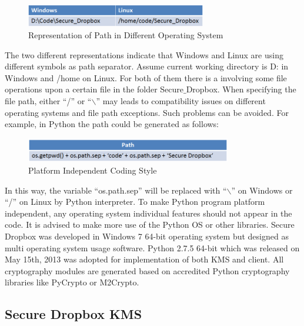 \begin{figure}[h]
        \centering
        \includegraphics[width=0.7\textwidth]{figures/Representation_of_Path_in_Different_Operation_System.png}
        \caption[Path Representation Schema] {Representation of Path in Different Operating System}
\end{figure}

The two different representations indicate that Windows and Linux are using different symbols as path separator. Assume current working directory is D: in Windows and /home on Linux. For both of them there is a involving some file operations upon a certain file in the folder Secure$\_$Dropbox. When specifying the file path, either ``/'' or ``$\backslash$'' may leads to compatibility issues on different operating systems and file path exceptions. Such problems can be avoided. For example, in Python the path could be generated as follows:

\begin{figure}[h]
        \centering
        \includegraphics[width=0.8\textwidth]{figures/Platform_Independent_Coding.png}
        \caption[Platform Independent Coding Style] {Platform Independent Coding Style}
\end{figure}

In this way, the variable ``os.path.sep'' will be replaced with ``$\backslash$'' on Windows or ``/'' on Linux by Python interpreter. To make Python program platform independent, any operating system individual features should not appear in the code. It is advised to make more use of the Python OS or other libraries. Secure Dropbox was developed in Windows 7 64-bit operating system but designed as multi operating system usage software. Python 2.7.5 64-bit which was released on May 15th, 2013 was adopted for implementation of both KMS and client. All cryptography modules are generated based on accredited Python cryptography libraries like PyCrypto or M2Crypto.

\subsection{Secure Dropbox KMS}

